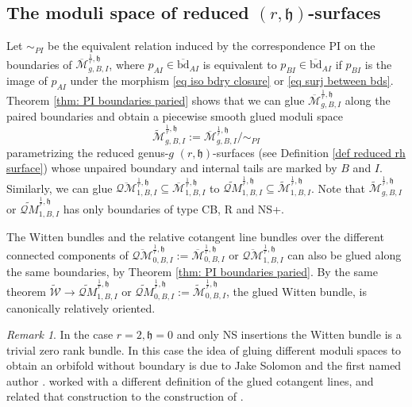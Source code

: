 \documentclass[11pt,a4paper]{article}
\theoremstyle{definition}
\theoremstyle{remark}
\newtheorem{rmk}[dummy]{Remark}
\newcommand{\oQMb}{{\overline{\mathcal{QM}}}}
\numberwithin{equation}{section}
\def\Mbar{{\overline{\mathcal M}}}
\def\PI{{\text{PI}}}
\def\h{{\mathfrak h}}
\begin{document}
\subsection{The moduli space of reduced $(r,\h)$-surfaces}
    Let $\sim_{PI}$ be the equivalent relation induced by the correspondence $\PI$ on the boundaries of $\Mbar^{\frac{1}{r},\h}_{g,B,I}$, where $p_{AI}\in \overline{\text{bd}}_{AI}$ is equivalent to $p_{BI}\in \overline{\text{bd}}_{AI}$ if $p_{BI}$ is the image of $p_{AI}$ under the morphism \eqref{eq iso bdry closure} or \eqref{eq surj between bds}. Theorem \ref{thm: PI boundaries paried} shows that we can glue $\Mbar^{\frac{1}{r},\h}_{g,B,I}$ along the paired boundaries and obtain a piecewise smooth glued moduli space
    $$
    \widetilde{\mathcal M}^{\frac{1}{r},\h}_{g,B,I}:=\Mbar^{\frac{1}{r},\h}_{g,B,I}\big/\sim_{PI}
    $$
    parametrizing the reduced genus-$g$ $(r,\h)$-surfaces  (see Definition \ref{def reduced rh surface}) whose unpaired boundary and internal tails are marked by $B$ and $I$. 
    Similarly, we can glue $\oQMb^{\frac{1}{r},\h}_{1,B,I}\subseteq\Mbar^{\frac{1}{r},\h}_{1,B,I}$ to $\widetilde{\mathcal QM}^{\frac{1}{r},\h}_{1,B,I}\subseteq \widetilde{\mathcal M}^{\frac{1}{r},\h}_{1,B,I}$.
    Note that $\widetilde{\mathcal M}^{\frac{1}{r},\h}_{g,B,I}$ or $\widetilde{\mathcal QM}^{\frac{1}{r},\h}_{1,B,I}$ has only boundaries of type CB, R and NS+.
   
    
    The Witten bundles and the relative cotangent line bundles over the different connected components of $\oQMb^{\frac{1}{r},\h}_{0,B,I}:=\Mbar^{\frac{1}{r},\h}_{0,B,I}$ or $\oQMb^{\frac{1}{r},\h}_{1,B,I}$  can also be glued along the same boundaries, by Theorem \ref{thm: PI boundaries paried}. By the same theorem $\widetilde{\mathcal W}\to \widetilde{\mathcal QM}^{\frac{1}{r},\h}_{1,B,I}$ or $\widetilde{\mathcal QM}^{\frac{1}{r},\h}_{0,B,I}:=\widetilde{\mathcal M}^{\frac{1}{r},\h}_{0,B,I}$, the glued Witten bundle, is canonically relatively oriented.
    \begin{rmk}
In the case $r=2,\h=0$ and only NS insertions the Witten bundle is a trivial zero rank bundle. In this case the idea of gluing different moduli spaces to obtain an orbifold without boundary is due to Jake Solomon and the first named author \cite{ST_unpublished}. \cite{ST_unpublished} worked with a different definition of the glued cotangent lines, and related that construction to the construction of \cite{PST14}.
\end{rmk}
\end{document}
